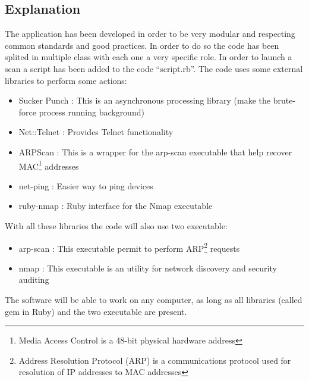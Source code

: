 \documentclass{report}
\begin{document}
\subsection{Explanation}
The application has been developed in order to be very modular and respecting common standards and good practices. In order to do so the code has been splited in multiple class with each one a very specific role. In order to launch a scan a script has been added to the code ``script.rb''.\newline
The code uses some external libraries to perform some actions:
\begin{itemize}
 \item Sucker Punch \autocite{suckerpunch}: This is an asynchronous processing library (make the brute-force process running background)
 \item Net::Telnet \autocite{nettelnet}: Provides Telnet functionality
 \item ARPScan \autocite{arpscan}: This is a wrapper for the arp-scan executable that help recover MAC\footnote{Media Access Control is a 48-bit physical hardware address} addresses
 \item net-ping \autocite{netping}: Easier way to ping devices
 \item ruby-nmap \autocite{rubynmap}: Ruby interface for the Nmap executable
\end{itemize}
With all these libraries the code will also use two executable:
\begin{itemize}
 \item arp-scan \autocite{arp-scan}: This executable permit to perform ARP\footnote{Address Resolution Protocol (ARP) is a communications protocol used for resolution of IP addresses to MAC addresses} requests
 \item nmap \autocite{nmap}: This executable is an utility for network discovery and security auditing
\end{itemize}
The software will be able to work on any computer, as long as all libraries (called gem in Ruby) and the two executable are present.
\end{document}

